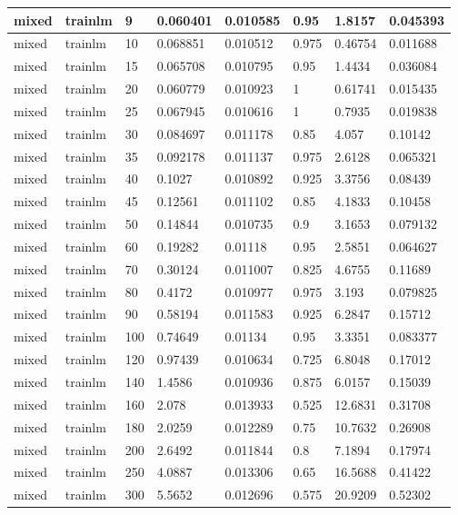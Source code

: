 \begin{longtable}{llllllll}
mixed & trainlm & 9 & 0.060401 & 0.010585 & 0.95 & 1.8157 & 0.045393 \\ \hline 
mixed & trainlm & 10 & 0.068851 & 0.010512 & 0.975 & 0.46754 & 0.011688 \\ \hline 
mixed & trainlm & 15 & 0.065708 & 0.010795 & 0.95 & 1.4434 & 0.036084 \\ \hline 
mixed & trainlm & 20 & 0.060779 & 0.010923 & 1 & 0.61741 & 0.015435 \\ \hline 
mixed & trainlm & 25 & 0.067945 & 0.010616 & 1 & 0.7935 & 0.019838 \\ \hline 
mixed & trainlm & 30 & 0.084697 & 0.011178 & 0.85 & 4.057 & 0.10142 \\ \hline 
mixed & trainlm & 35 & 0.092178 & 0.011137 & 0.975 & 2.6128 & 0.065321 \\ \hline 
mixed & trainlm & 40 & 0.1027 & 0.010892 & 0.925 & 3.3756 & 0.08439 \\ \hline 
mixed & trainlm & 45 & 0.12561 & 0.011102 & 0.85 & 4.1833 & 0.10458 \\ \hline 
mixed & trainlm & 50 & 0.14844 & 0.010735 & 0.9 & 3.1653 & 0.079132 \\ \hline 
mixed & trainlm & 60 & 0.19282 & 0.01118 & 0.95 & 2.5851 & 0.064627 \\ \hline 
mixed & trainlm & 70 & 0.30124 & 0.011007 & 0.825 & 4.6755 & 0.11689 \\ \hline 
mixed & trainlm & 80 & 0.4172 & 0.010977 & 0.975 & 3.193 & 0.079825 \\ \hline 
mixed & trainlm & 90 & 0.58194 & 0.011583 & 0.925 & 6.2847 & 0.15712 \\ \hline 
mixed & trainlm & 100 & 0.74649 & 0.01134 & 0.95 & 3.3351 & 0.083377 \\ \hline 
mixed & trainlm & 120 & 0.97439 & 0.010634 & 0.725 & 6.8048 & 0.17012 \\ \hline 
mixed & trainlm & 140 & 1.4586 & 0.010936 & 0.875 & 6.0157 & 0.15039 \\ \hline 
mixed & trainlm & 160 & 2.078 & 0.013933 & 0.525 & 12.6831 & 0.31708 \\ \hline 
mixed & trainlm & 180 & 2.0259 & 0.012289 & 0.75 & 10.7632 & 0.26908 \\ \hline 
mixed & trainlm & 200 & 2.6492 & 0.011844 & 0.8 & 7.1894 & 0.17974 \\ \hline 
mixed & trainlm & 250 & 4.0887 & 0.013306 & 0.65 & 16.5688 & 0.41422 \\ \hline 
mixed & trainlm & 300 & 5.5652 & 0.012696 & 0.575 & 20.9209 & 0.52302 \\ \hline 

\end{longtable}
